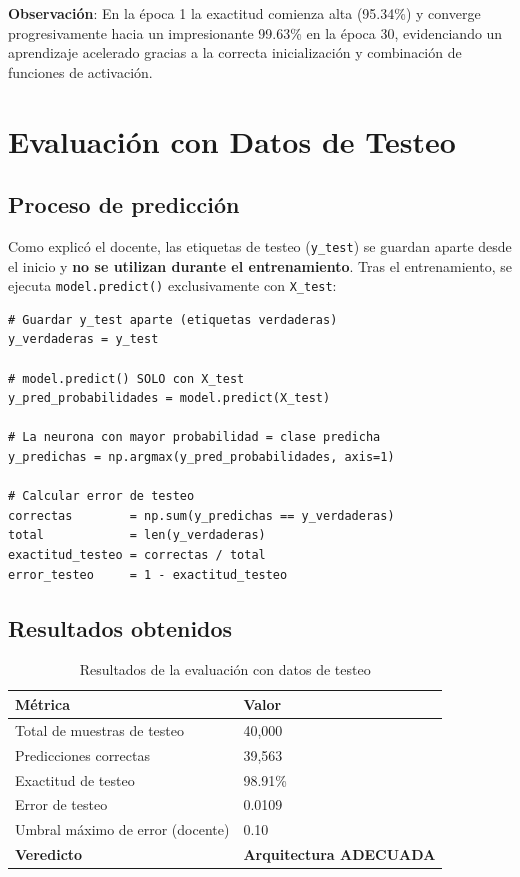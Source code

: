 \documentclass[12pt,a4paper]{article}
\begin{document}
\textbf{Observación}: En la época 1 la exactitud comienza alta (95.34\%) y converge progresivamente hacia un impresionante 99.63\% en la época 30, evidenciando un aprendizaje acelerado gracias a la correcta inicialización y combinación de funciones de activación.

\section{Evaluación con Datos de Testeo}

\subsection{Proceso de predicción}

Como explicó el docente, las etiquetas de testeo (\texttt{y\_test}) se guardan aparte desde el inicio y \textbf{no se utilizan durante el entrenamiento}. Tras el entrenamiento, se ejecuta \texttt{model.predict()} exclusivamente con \texttt{X\_test}:

\begin{lstlisting}[style=pythonstyle, caption=Predicción y evaluación con datos de testeo]
# Guardar y_test aparte (etiquetas verdaderas)
y_verdaderas = y_test

# model.predict() SOLO con X_test
y_pred_probabilidades = model.predict(X_test)

# La neurona con mayor probabilidad = clase predicha
y_predichas = np.argmax(y_pred_probabilidades, axis=1)

# Calcular error de testeo
correctas        = np.sum(y_predichas == y_verdaderas)
total            = len(y_verdaderas)
exactitud_testeo = correctas / total
error_testeo     = 1 - exactitud_testeo
\end{lstlisting}

\subsection{Resultados obtenidos}

\begin{table}[H]
    \centering
    \begin{tabular}{@{}ll@{}}
        \toprule
        \textbf{Métrica} & \textbf{Valor} \\
        \midrule
        Total de muestras de testeo & 40,000 \\
        Predicciones correctas & 39,563 \\
        Exactitud de testeo & 98.91\% \\
        Error de testeo & 0.0109 \\
        Umbral máximo de error (docente) & 0.10 \\
        \midrule
        \textbf{Veredicto} & \textbf{Arquitectura ADECUADA} \\
        \bottomrule
    \end{tabular}
    \caption{Resultados de la evaluación con datos de testeo}
\end{table}
\end{document}
